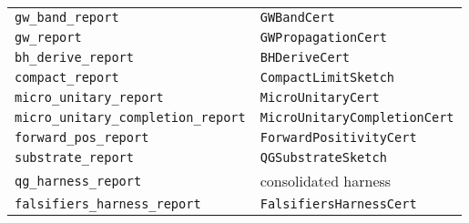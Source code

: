 \documentclass[11pt]{article}
\begin{document}
\begin{center}
\begin{tabular}{l l}
\texttt{gw\_band\_report} & \texttt{GWBandCert} \\
\texttt{gw\_report} & \texttt{GWPropagationCert} \\
\texttt{bh\_derive\_report} & \texttt{BHDeriveCert} \\
\texttt{compact\_report} & \texttt{CompactLimitSketch} \\
\texttt{micro\_unitary\_report} & \texttt{MicroUnitaryCert} \\
\texttt{micro\_unitary\_completion\_report} & \texttt{MicroUnitaryCompletionCert} \\
\texttt{forward\_pos\_report} & \texttt{ForwardPositivityCert} \\
\texttt{substrate\_report} & \texttt{QGSubstrateSketch} \\
\texttt{qg\_harness\_report} & consolidated harness \\
\texttt{falsifiers\_harness\_report} & \texttt{FalsifiersHarnessCert} \\
\hline
\end{tabular}
\end{center}
\end{document}
